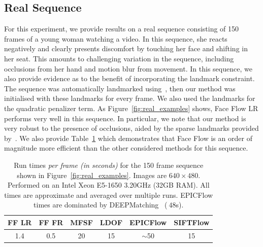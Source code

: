 \subsection{Real Sequence}\label{subsec:experiments_real}
For this experiment, we provide results on a real sequence consisting
of 150 frames of a young woman watching a video. In this sequence, she reacts
negatively and clearly presents discomfort by touching her face and shifting
in her seat. This amounts to challenging variation in the sequence, including
occlusions from her hand and motion blur from movement. In this sequence,
we also provide evidence as to the benefit of incorporating the landmark constraint. The sequence was
automatically landmarked using~\cite{kazemi2014one}, then our method was initialised with
these landmarks for every frame. We also used the landmarks for the quadratic penalizer term.
As Figure~\ref{fig:real_examples} shows, Face Flow LR performs very well in this sequence. In particular,
we note that our method is very robust to the presence of occlusions, aided by the sparse
landmarks provided by~\cite{kazemi2014one}. We also provide Table~\ref{tbl:run_times}
which demonstrates that Face Flow is an order of magnitude more efficient than
the other considered methods for this sequence.
\begin{table}[t]
    \centering
    \begin{tabular}{cccccc}
                                                     \toprule
FF LR & FF FR & MFSF & LDOF & EPICFlow & SIFTFlow \\ \toprule
1.4   & 0.5   & 20   & 15   & $\sim$50 & 15       \\ \bottomrule
    \end{tabular}
    \caption{Run times \textit{per frame (in seconds)} for the 150 frame
             sequence shown in Figure~\ref{fig:real_examples}. Images are
             $640\times480$. Performed on an Intel Xeon E5-1650 3.20GHz
             (32GB RAM). All times are approximate and averaged over multiple
             runs. EPICFlow times are dominated by
             DEEPMatching~\cite{weinzaepfel2013deepflow} ($~48$s).}
\label{tbl:run_times}
\end{table}
